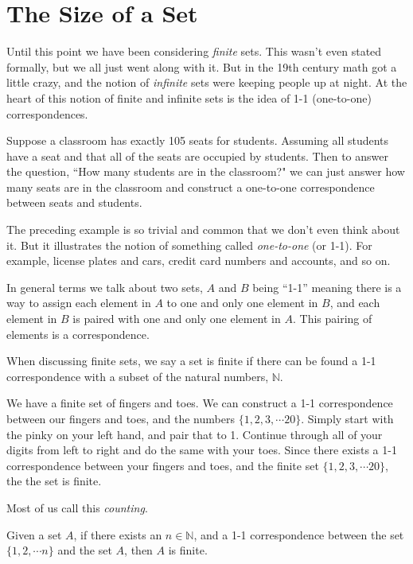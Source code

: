 \section{The Size of a Set}\label{section1_6}
Until this point we have been considering \emph{finite} sets.  This wasn't even stated formally, but we all just went along with it.  But in the 19th century math got a little crazy, and the notion of \emph{infinite} sets were keeping people up at night.  At the heart of this notion of finite and infinite sets is the idea of 1-1 (one-to-one) correspondences.  

\begin{example}    Suppose a classroom has exactly 105 seats for students.  Assuming all students have a seat and that all of the seats are occupied by students.  Then to answer the question, ``How many students are in the classroom?"  we can just answer how many seats are in the classroom and construct a one-to-one correspondence between seats and students.  
\end{example}
The preceding example is so trivial and common that we don't even think about it.  But it illustrates the notion of something called \emph{one-to-one} (or 1-1).  For example, license plates and cars, credit card numbers and accounts, and so on.

In general terms we talk about two sets, $A$ and $B$ being ``1-1'' meaning there is a way to assign each element in $A$ to one and only one element in $B$, and each element in $B$ is paired with one and only one element in $A$.  This pairing of elements is a correspondence.

When discussing finite sets, we say a set is finite if there can be found a 1-1 correspondence with a subset of the natural numbers, $\mathbb{N}$.  

\begin{example}
We have a finite set of fingers and toes.  We can construct a 1-1 correspondence between our fingers and toes, and the numbers $\{1, 2, 3, \cdots 20\}$.  Simply start with the pinky on your left hand, and pair that to 1.  Continue through all of your digits from left to right and do the same with your toes.  Since there exists a 1-1 correspondence between your fingers and toes, and the finite set $\{1, 2, 3, \cdots 20\}$, the the set is finite.
\end{example}

Most of us call this \emph{counting}.  \smiley

\begin{definition}
Given a set $A$, if there exists an $n\in \mathbb{N}$, and a 1-1 correspondence between the set $\{1, 2, \cdots n\}$ and the set $A$, then $A$ is finite.
\end{definition}\label{finitesets}

